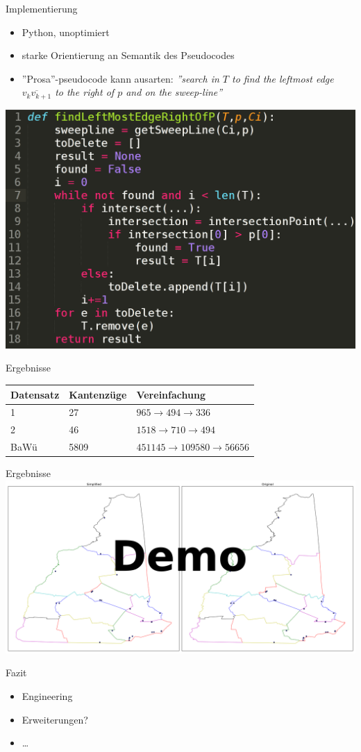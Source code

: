 \documentclass[14pt]{beamer}
\begin{document}
\begin{frame}{Implementierung}
  \begin{itemize}
  \item Python, unoptimiert
  \item starke Orientierung an Semantik des Pseudocodes
  \item ''Prosa''-pseudocode kann ausarten: \emph{''search in $T$ to find the leftmost edge $\overline{v_kv_{k+1}}$ to the right of $p$ and on the
sweep-line''}
\end{itemize}

\includegraphics[width=.8\textwidth,center]{img/implvspseudo.png}
\end{frame}

\begin{frame}{Ergebnisse}
  \begin{tabular}{l|l|l}
    Datensatz & Kantenzüge & Vereinfachung \\
    \hline \hline
    1 & 27 & $965 \rightarrow 494 \rightarrow 336$ \\
    2 & 46 & $1518 \rightarrow 710 \rightarrow 494$ \\
    BaWü & 5809 & $451145 \rightarrow 109580 \rightarrow 56656$
  \end{tabular}
\end{frame}

\begin{frame}{Ergebnisse}
\includegraphics[width=1.25\textwidth,center]{img/result_dataset1.pdf}
\end{frame}

\begin{frame}{Fazit}
  \begin{itemize}
	\item Engineering
	\item Erweiterungen?
	\item \dots
\end{itemize}
\end{frame}
\end{document}

